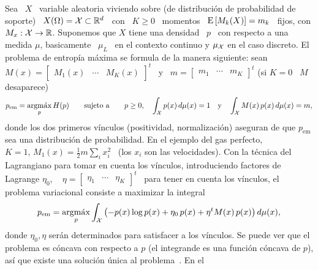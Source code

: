 Sea \ $X$ \ variable aleatoria viviendo sobre (de distribuci\'on de probabilidad
de soporte) \  $X(\Omega) = \mathcal{X} \subset \mathbb{R}^d$  \ con \ $K \ge 0$  \ momentos \
$\operatorname{E}\left[ M_k(X)  \right] = m_k$ \  fijos, con $M_x: \mathcal{X}  \to \mathbb{R}$. Suponemos
que  $X$  tiene  una  densidad  \  $p$  \  con  respecto  a  una  medida  $\mu$,
basicamente  \  $\mu_L$  \  en  el  contexto continuo  y  $\mu_{\mathcal{X}}$  en  el  caso
discreto. El problema de entrop\'ia m\'axima  se formula de la manera siguiente:
sean \ $M(x) =  \begin{bmatrix} M_1(x) & \cdots & M_K(x)  \end{bmatrix}^t$ \ y \
$m =  \begin{bmatrix} m_1  & \cdots  & m_K \end{bmatrix}^t$  (si $K  = 0$  \ $M$
desaparece)
%
\[
p_{\mathrm{em}}  =   \operatorname*{argm\acute{a}x}_p  H(p)  \qquad   \mbox{sujeto  a}  \qquad   p  \ge
0, \quad \int_{\mathcal{X}} p(x) \, d\mu(x) = 1 \quad \mbox{y}
\quad \int_{\mathcal{X}} M(x) \, p(x) \, d\mu(x) = m,
\]
%
donde los dos primeros v\'inculos (positividad, normalizaci\'on) aseguran de que
$p_{\mathrm{em}}$ sea una distribuci\'on de  probabilidad. En el ejemplo del gas
perfecto, $K  = 1,  \, M_1(x) =  \frac12 m  \sum_i x_i^2$ \  (los $x_i$  son las
velocidades).   Con  la t\'ecnica  del  Lagrangiano  para  tomar en  cuenta  los
v\'inculos,   introduciendo   factores   de   Lagrange   $\eta_0,   \quad   \eta
= \begin{bmatrix}  \eta_1 &  \cdots &  \eta_K \end{bmatrix}^t$  \ para  tener en
cuenta  los  v\'inculos,  el  problema   variacional  consiste  a  maximizar  la
integral~\cite{GelFom63, Bru04, Mil00, CamMar09, CovTho06}
%
\[
p_{\mathrm{em}} =  \operatorname*{argm\acute{a}x}_p \int_{\mathcal{X}} \left(  - p(x) \log  p(x) + \eta_0  \, p(x)
  + \eta^t M(x) \, p(x) \right) d\mu(x),
\]
%
donde $\eta_0, \eta$  ser\'an determinados para satisfacer a  los v\'inculos. Se
puede ver que el problema es c\'oncava  con respecto a $p$ (\ie el integrande es
una funci\'on  c\'oncava de  $p$), as\'i  que existe  una soluci\'on  \'unica al
problema~\cite{GelFom63, Wei74,  Bru04, Mil00,  CamMar09, Cla13, Kom14}.   En el
